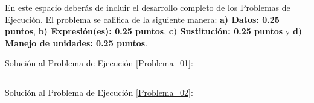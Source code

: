 \documentclass[12pt, letter]{exam}
\begin{document}
En este espacio deberás de incluir el desarrollo completo de los Problemas de Ejecución. El problema se califica de la siguiente manera: \textbf{a) Datos: 0.25 puntos}, \textbf{b) Expresión(es): 0.25 puntos}, \textbf{c) Sustitución: 0.25 puntos} y \textbf{d) Manejo de unidades: 0.25 puntos}.

\vspace*{0.5cm}
Solución al Problema de Ejecución \ref{Problema_01}:

\vspace*{4cm}
\rule{0.9\textwidth}{0.3mm}

Solución al Problema de Ejecución \ref{Problema_02}:
\end{document}
